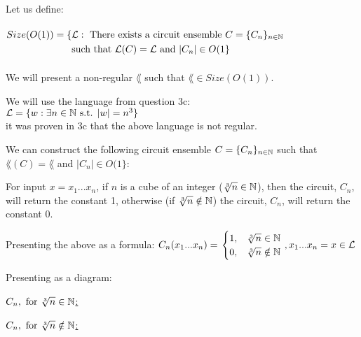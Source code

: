 Let us define: \\ \\
$
    \begin{aligned}
        Size(O(1)) = \{ & \mathcal{L} : \text{ There exists a circuit ensemble } C=\{C_n\}_{n \in \mathbb{N}} \\
                        & \text{such that } \mathcal{L}(C)=\mathcal{L} \text{ and } |C_n|\in O(1\}
    \end{aligned}
$ \\ \\
We will present a non-regular $\lang$ such that $\lang \in Size(O(1))$.

We will use the language from question 3c: \\
$\mathcal{L}=\{w : \exists n \in \mathbb{N} \text{ s.t. } |w| = n^3\}$ \\
it was proven in 3c that the above language is not regular.

We can construct the following circuit ensemble $C=\{C_n\}_{n \in \mathbb{N}}$ such that
$\lang(C)=\lang$ and $|C_n|\in O(1\}$:

For input $x=x_1...x_n$, if $n$ is a cube of an integer ($\sqrt[3]{n} \in \mathbb{N}$), then
the circuit, $C_n$, will return the constant 1, otherwise (if $\sqrt[3]{n} \notin \mathbb{N}$)
the circuit, $C_n$, will return the constant 0.

Presenting the above as a formula:
$
    C_n(x_1 ... x_n) = \left.
    \begin{cases}
        1 , & \sqrt[3]{n} \in \mathbb{N}    \\
        0 , & \sqrt[3]{n} \notin \mathbb{N} \\
    \end{cases}
    \right. , x_1...x_n = x \in \mathcal{L}
$

Presenting as a diagram:

\underline{$C_n, \text{ for } \sqrt[3]{n} \in \mathbb{N}$:}
\begin{center}
\end{center}

\underline{$C_n, \text{ for } \sqrt[3]{n} \notin \mathbb{N}$:}
\begin{center}
\end{center}

